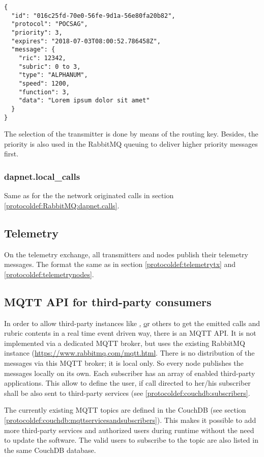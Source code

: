 \begin{lstlisting}
{
  "id": "016c25fd-70e0-56fe-9d1a-56e80fa20b82",
  "protocol": "POCSAG",
  "priority": 3,
  "expires": "2018-07-03T08:00:52.786458Z",
  "message": {
    "ric": 12342,
    "subric": 0 to 3,
    "type": "ALPHANUM",
    "speed": 1200,
    "function": 3,
    "data": "Lorem ipsum dolor sit amet"
  }
}
\end{lstlisting}
The selection of the transmitter is done by means of the routing key. Besides,
the priority is also used in the RabbitMQ queuing to deliver higher priority
messages first.

\subsubsection{dapnet.local\_calls}
\label{protocoldef:RabbitMQ:dapnet.local_calls}
Same as for the the network originated calls in section \ref{protocoldef:RabbitMQ:dapnet.calls}.

\subsection{Telemetry}
On the telemetry exchange, all transmitters and nodes publish their telemetry messages. The format the same as in section \ref{protocoldef:telemetrytx} and \ref{protocoldef:telemetrynodes}.

\subsection{MQTT API for third-party consumers}
\label{protocoldef:mqttapi}
In order to allow third-party instances like \href{http://www.aprs-is.net/|APRS}, \href{http://brandmeister.network|Brandmeister} or others to get the emitted calls and rubric contents in a real time event driven way, there is an MQTT API. It is not implemented via a dedicated MQTT broker, but uses the existing RabbitMQ instance (\url{https://www.rabbitmq.com/mqtt.html}. There is no distribution of the messages via this MQTT broker; it is local only. So every node publishes the messages locally on its own.
Each subscriber has an array of enabled third-party applications. This allow to define the user, if call directed to her/his subscriber shall be also sent to third-party services (see \ref{protocoldef:couchdb:subscribers}.

The currently existing MQTT topics are defined in the CouchDB (see section \ref{protocoldef:couchdb:mqttservicesandsubscribers}). This makes it possible to add more third-party services and authorized users during runtime without the need to update the software.
The valid users to subscribe to the topic are also listed in the same CouchDB database.

